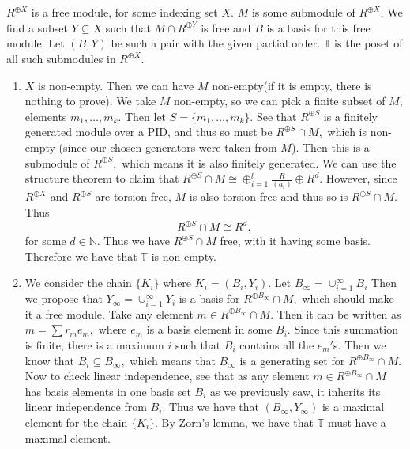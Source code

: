 \documentclass{article}
\begin{document}
\section{} %
$R^{\oplus X}$ is a free module, for some indexing set $X.$ $M$ is some submodule of $R^{\oplus X}.$ We find a subset $Y \subseteq X$ such that $M \cap 
R^{\oplus Y}$ is free and $B$ is a basis for this free module. Let $(B,Y)$ be such a pair with the given partial order. $\mathbb{T}$ is the poset of all 
such submodules in $R^{\oplus X}.$
\begin{enumerate}
	\item $X$ is non-empty. Then we can have $M$ non-empty(if it is empty, there is nothing to prove). We take $M$ non-empty, so we can pick a finite subset 
	of $M,$ elements $m_1,\dots,m_k.$ Then let $S=\{m_1,\dots,m_k\}.$ See that $R^{\oplus S}$ is a finitely generated module over a PID, and thus so must be 
	$R^{\oplus S}\cap M,$ which is non-empty (since our chosen generators were taken from $M$). Then this is a submodule of $R^{\oplus S},$ which means it 
	is also finitely generated. We can use the structure theorem to claim that $R^{\oplus S} \cap M \cong \oplus_{i=1}^l \frac{R}{(a_i)} \oplus R^d$. 
	However, since $R^{\oplus X}$ and $R^{\oplus S}$ are torsion free, $M$ is also torsion free and thus so is $ R^{\oplus S} \cap M.$ Thus $$R^{\oplus S} 
	\cap M \cong R^d,$$ for some $d \in \mathbb{N}.$ Thus we have $R^{\oplus S} \cap M$ free, with it having some basis. Therefore we have that $\mathbb{T}$ 
	is non-empty. 
	
	\item We consider the chain $\{K_i\}$ where $K_i=(B_i,Y_i).$ Let $B_{\infty}=\cup_{i=1}^{\infty}B_i$ Then we propose that 
	$Y_{\infty}=\cup_{i=1}^{\infty}Y_i$ is a basis for $R^{\oplus B_{\infty}}\cap M,$ which should make it a free module. Take any element $m \in R^{\oplus 
	B_{\infty}}\cap M.$ Then it can be written as $m=\sum r_me_m,$ where $e_m$ is a basis element in some $B_i.$ Since this summation is finite, there is a 
	maximum $i$ such that $B_i$ contains all the $e_m'$s. Then we know that $B_i \subseteq B_{\infty},$ which means that $B_{\infty}$ is a generating set 
	for $ R^{\oplus B_{\infty}}\cap M.$  Now to check linear independence, see that as any element $m \in R^{\oplus B_{\infty}}\cap M$ has basis elements in 
	one basis set $B_i$ as we previously saw, it inherits its linear independence from $B_i.$ Thus we have that $(B_{\infty},Y_{\infty})$ is a maximal 
	element for the chain $\{K_i\}$. By Zorn's lemma, we have that $\mathbb{T}$ must have a maximal element.
	

\end{enumerate}
\end{document}
